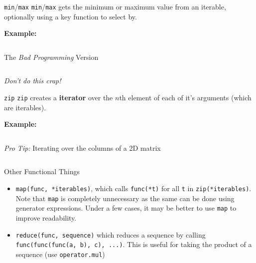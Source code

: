 \documentclass{lug}
\begin{document}
\begin{frame}{\texttt{min}/\texttt{max}}
    \texttt{min}/\texttt{max} gets the minimum or maximum value from an
    iterable, optionally using a key function to select by.

    \pause

    \textbf{Example:}
    \begin{minipage}{\linewidth}
        \centering
        \inputminted{python3}{examples/minmax.py}
    \end{minipage}

    \medskip
    \pause

    \begin{block}{The \emph{Bad Programming} Version}
        \begin{minipage}{\linewidth}
            \inputminted{python3}{examples/minmax_bad.py}
        \end{minipage}

        {\centering\emph{Don't do this crap!}\par}
    \end{block}
\end{frame}

\begin{frame}{\texttt{zip}}
    \texttt{zip} creates a \textbf{iterator} over the $n$th element of each of
    it's arguments (which are iterables).

    \pause

    \textbf{Example:}
    \inputminted{python3}{examples/zip.py}

    \pause

    \begin{block}{\emph{Pro Tip:} Iterating over the columns of a 2D matrix}
        \begin{minipage}{\linewidth}
            \inputminted{python3}{examples/zip_matrix.py}
        \end{minipage}
    \end{block}
\end{frame}

\begin{frame}{Other Functional Things}
    \begin{itemize}[<+->]
        \item \texttt{map(func, *iterables)}, which calls \texttt{func(*t)} for
            all \texttt{t} in \texttt{zip(*iterables)}. Note that \texttt{map}
            is completely unnecessary as the same can be done using generator
            expressions. Under a few cases, it may be better to use
            \texttt{map} to improve readability.
        \item \texttt{reduce(func, sequence)} which reduces a sequence by
            calling \texttt{func(func(func(a, b), c), ...)}. This is useful for
            taking the product of a sequence (use \texttt{operator.mul})
    \end{itemize}
\end{frame}
\end{document}
